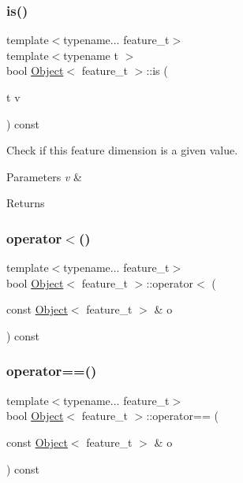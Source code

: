 \subsubsection{\texorpdfstring{is()}{is()}}
{\footnotesize\ttfamily template$<$typename... feature\+\_\+t$>$ \\
template$<$typename t $>$ \\
bool \hyperlink{struct_object}{Object}$<$ feature\+\_\+t $>$\+::is (\begin{DoxyParamCaption}\item[{t}]{v }\end{DoxyParamCaption}) const\hspace{0.3cm}{\ttfamily [inline]}}



Check if this feature dimension is a given value. 


\begin{DoxyParams}{Parameters}
{\em v} & \\
\hline
\end{DoxyParams}
\begin{DoxyReturn}{Returns}

\end{DoxyReturn}
\mbox{\label{struct_object_a0475b6347042bc03cf1cb023fc6c36b3}} 
\subsubsection{\texorpdfstring{operator$<$()}{operator<()}}
{\footnotesize\ttfamily template$<$typename... feature\+\_\+t$>$ \\
bool \hyperlink{struct_object}{Object}$<$ feature\+\_\+t $>$\+::operator$<$ (\begin{DoxyParamCaption}\item[{const \hyperlink{struct_object}{Object}$<$ feature\+\_\+t $>$ \&}]{o }\end{DoxyParamCaption}) const\hspace{0.3cm}{\ttfamily [inline]}}

\mbox{\label{struct_object_a39a1f236eb1afac749bf956124dab79d}} 
\subsubsection{\texorpdfstring{operator==()}{operator==()}}
{\footnotesize\ttfamily template$<$typename... feature\+\_\+t$>$ \\
bool \hyperlink{struct_object}{Object}$<$ feature\+\_\+t $>$\+::operator== (\begin{DoxyParamCaption}\item[{const \hyperlink{struct_object}{Object}$<$ feature\+\_\+t $>$ \&}]{o }\end{DoxyParamCaption}) const\hspace{0.3cm}{\ttfamily [inline]}}

